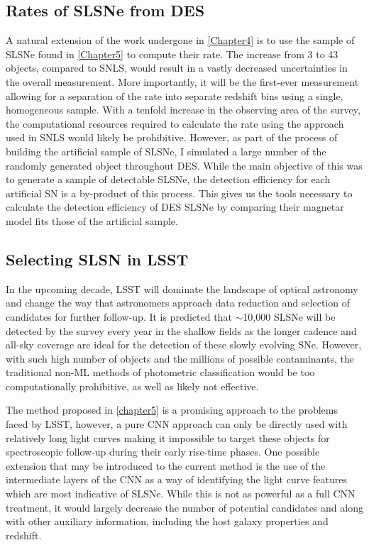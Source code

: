 \subsection{Rates of SLSNe from DES}
A natural extension of the work undergone in \cref{Chapter4} is to use the sample of SLSNe found in \cref{Chapter5} to compute their rate. The increase from 3 to 43 objects, compared to SNLS, would result in a vastly decreased uncertainties in the overall measurement. More importantly, it will be the first-ever measurement allowing for a separation of the rate into separate redshift bins using a single, homogeneous sample. With a tenfold increase in the observing area of the survey, the computational resources required to calculate the rate using the approach used in SNLS would likely be prohibitive. However, as part of the process of building the artificial sample of SLSNe, I simulated a large number of the randomly generated object throughout DES. While the main objective of this was to generate a sample of detectable SLSNe, the detection efficiency for each artificial SN is a by-product of this process. This gives us the tools necessary to calculate the detection efficiency of DES SLSNe by comparing their magnetar model fits those of the artificial sample.

\subsection{Selecting SLSN in LSST}
In the upcoming decade, LSST will dominate the landscape of optical astronomy and change the way that astronomers approach data reduction and selection of candidates for further follow-up. It is predicted that $\sim$10,000 SLSNe will be detected by the survey every year in the shallow fields as the longer cadence and all-sky coverage are ideal for the detection of these slowly evolving SNe. However, with such high number of objects and the millions of possible contaminants, the traditional non-ML methods of photometric classification would be too computationally prohibitive, as well as likely not effective.

The method proposed in \cref{chapter5} is a promising approach to the problems faced by LSST, however, a pure CNN approach can only be directly used with relatively long light curves making it impossible to target these objects for spectroscopic follow-up during their early rise-time phases. One possible extension that may be introduced to the current method is the use of the intermediate layers of the CNN as a way of identifying the light curve features which are most indicative of SLSNe. While this is not as powerful as a full CNN treatment, it would largely decrease the number of potential candidates and along with other auxiliary information, including the host galaxy properties and redshift.


